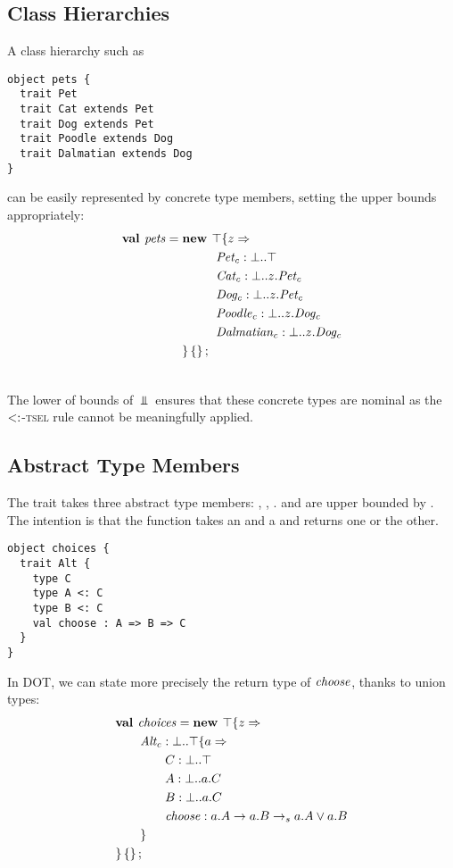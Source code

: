 \documentclass[9pt]{sigplanconf}
\begin{document}
\subsection{Class Hierarchies}
A class hierarchy such as
\begin{lstlisting}
object pets {
  trait Pet
  trait Cat extends Pet
  trait Dog extends Pet
  trait Poodle extends Dog
  trait Dalmatian extends Dog
}
\end{lstlisting}
can be easily represented by concrete type members, setting the upper
bounds appropriately:
\begin{align*}
\textbf{val }\mathit{pets} = \textbf{new }&\top \{z \Rightarrow \\
&\ \mathit{Pet_c} : \bot..\top\\
&\ \mathit{Cat_c} : \bot..z.{\mathit{Pet_c}}\\
&\ \mathit{Dog_c} : \bot..z.{\mathit{Pet_c}}\\
&\ \mathit{Poodle_c} : \bot..z.{\mathit{Dog_c}}\\
&\ \mathit{Dalmatian_c} : \bot..z.{\mathit{Dog_c}}\\
 \} \left\{\right\} ;\;\\&
\end{align*}

The lower of bounds of $\Bot$ ensures that these concrete types are
nominal as the \textsc{$<:$-tsel} rule cannot be meaningfully
applied.

\subsection{Abstract Type Members}
The  trait takes three abstract type members:
, , .  and  are upper bounded
by . The intention is that the  function takes an
 and a  and returns one or the other.
\begin{lstlisting}
object choices {
  trait Alt {
    type C
    type A <: C
    type B <: C
    val choose : A => B => C
  }
}
\end{lstlisting}
In DOT, we can state more precisely the return type of $\mathit{choose}$,
thanks to union types:
\begin{align*}
&\textbf{val }\mathit{choices} = \textbf{new }\top \{z \Rightarrow \\
&\quad\quad\mathit{Alt_c} : \bot..\top \{a \Rightarrow \\
&\quad\quad\quad\quad C : \bot..\top\\
&\quad\quad\quad\quad A : \bot..a.C\\
&\quad\quad\quad\quad B : \bot..a.C\\
&\quad\quad\quad\quad\mathit{choose} : a.A \rightarrow a.B\rightarrow_sa.A \vee a.B\\
&\quad\quad \}\\
& \}\left\{\right\} ;\;
\end{align*}
\end{document}
